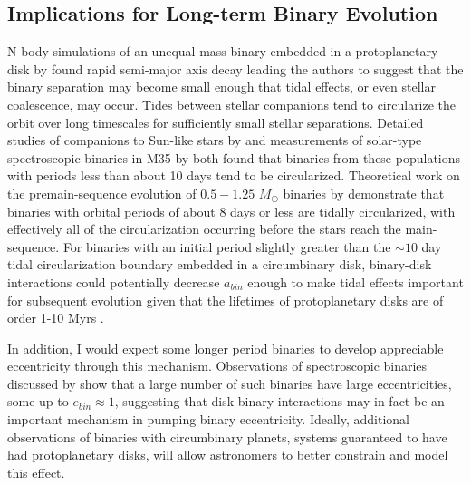 	
\subsection{Implications for Long-term Binary Evolution} \label{CBDisk:sec:tidal_implications}

N-body simulations of an unequal mass binary embedded in a
protoplanetary disk by \citet{Artymowicz1991} found rapid semi-major axis decay leading the
authors to suggest that the binary separation may become small enough that tidal effects, or even stellar coalescence, may occur.  Tides 
between stellar companions tend to circularize the orbit over long timescales for sufficiently small stellar separations.  Detailed studies of 
companions to Sun-like stars by \citet{Raghavan2010} and measurements of solar-type spectroscopic binaries in M35 by \citet{Meibom2005} both found that 
binaries from these populations with periods less than about 10 days tend to be circularized.  Theoretical work on the premain-sequence evolution of 
$0.5-1.25$ $M_{\odot}$ binaries by \citet{Zahn1989} demonstrate that binaries with orbital periods of about 8 days or less are tidally circularized, with effectively all 
of the circularization occurring before the stars reach the main-sequence.  For binaries with an initial period slightly greater than the $\sim 10$ day tidal 
circularization boundary embedded in a circumbinary disk, binary-disk interactions could potentially decrease $a_{bin}$ enough to make tidal effects important 
for subsequent evolution given that the lifetimes of protoplanetary disks are of order 1-10 Myrs \citep{Haisch2001}.

In addition, I would expect some longer period binaries to develop appreciable eccentricity through this mechanism.  Observations of spectroscopic binaries discussed by \citet{Mazeh2008} show that a large number of such binaries have large eccentricities, some up to $e_{bin} \approx 1$, suggesting that disk-binary interactions may in fact be an important mechanism in pumping binary eccentricity.  Ideally, additional observations of binaries with circumbinary planets, systems guaranteed to have had protoplanetary disks, will allow astronomers to better constrain and model this effect.

